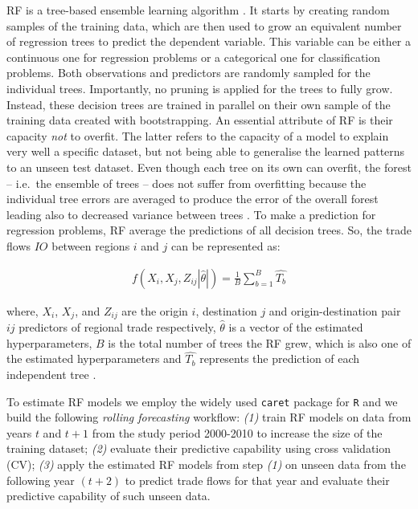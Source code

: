 \documentclass[]{interact}
\theoremstyle{plain}%
\theoremstyle{definition}
\theoremstyle{remark}
\begin{document}
RF is a tree-based ensemble learning algorithm
\citep{breiman2001random}. It starts by creating random samples of the
training data, which are then used to grow an equivalent number of
regression trees to predict the dependent variable. This variable can be
either a continuous one for regression problems or a categorical one for
classification problems. Both observations and predictors are randomly
sampled for the individual trees. Importantly, no pruning is applied for
the trees to fully grow. Instead, these decision trees are trained in
parallel on their own sample of the training data created with
bootstrapping. An essential attribute of RF is their capacity \emph{not}
to overfit. The latter refers to the capacity of a model to explain very
well a specific dataset, but not being able to generalise the learned
patterns to an unseen test dataset. Even though each tree on its own can
overfit, the forest -- i.e.~the ensemble of trees -- does not suffer
from overfitting because the individual tree errors are averaged to
produce the error of the overall forest leading also to decreased
variance between trees \citep{last2002improving}. To make a prediction
for regression problems, RF average the predictions of all decision
trees. So, the trade flows \(IO\) between regions \(i\) and \(j\) can be
represented as:

\begin{align}
f(X_{i}, X_{j}, Z_{ij}|\hat{\theta}|) = \frac{1}{B} \sum_{b = 1}^{B} \hat{T_{b}} \label{eq:trees}
\end{align}

where, \(X_{i}\), \(X_{j}\), and \(Z_{ij}\) are the origin \(i\),
destination \(j\) and origin-destination pair \(ij\) predictors of
regional trade respectively, \(\hat{\theta}\) is a vector of the
estimated hyperparameters, \(B\) is the total number of trees the RF
grew, which is also one of the estimated hyperparameters and
\(\hat{T_{b}}\) represents the prediction of each independent tree
\citep{yan2020using}.

To estimate RF models we employ the widely used \texttt{caret} package
for \texttt{R} \citep{kuhn2008building} and we build the following
\emph{rolling forecasting} workflow: \emph{(1)} train RF models on data
from years \(t\) and \(t + 1\) from the study period 2000-2010 to
increase the size of the training dataset; \emph{(2)} evaluate their
predictive capability using cross validation (CV); \emph{(3)} apply the
estimated RF models from step \emph{(1)} on unseen data from the
following year \((t + 2)\) to predict trade flows for that year and
evaluate their predictive capability of such unseen data.
\end{document}

